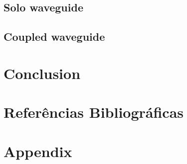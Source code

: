 \documentclass[final,12pt,times,twocolumn,authoryear]{elsarticle}
\begin{document}
\subsection{Solo waveguide}
\label{subsec:rectangle_solo}

\subsection{Coupled waveguide}
\label{subsec:rectangle_coupled}

\section{Conclusion}
\label{sec:conclusion}

\section*{Referências Bibliográficas}

\section*{Appendix}
\label{sec:appendix}
\end{document}
